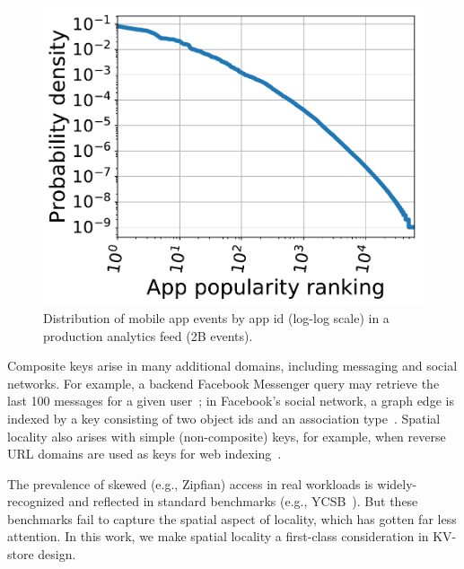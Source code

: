 

\begin{figure}[tb]
\centering
\includegraphics[width=0.6\columnwidth]{figs/app_names_loglog_line.pdf}
\caption{{Distribution of mobile app events by app id (log-log scale) in a production analytics feed (2B events).}}
\label{fig:cdf}
\end{figure}

Composite keys arise in many additional domains, including messaging and social networks. 
For example, a backend Facebook Messenger query may retrieve the last 100 messages for a 
given user~\cite{Borthakur:2011:AHG:1989323.1989438}; %
in Facebook's social network, a graph edge is indexed by a key consisting of two 
object ids and an association type~\cite{Armstrong:2013:LDB:2463676.2465296}.
Spatial locality   also arises with simple (non-composite) keys, for example, when 
reverse  URL domains are used as keys for web  indexing~\cite{Cho:1998:ECT:297805.297835}. 

The prevalence of skewed (e.g., Zipfian)  access  in real workloads is widely-recognized 
and reflected in standard benchmarks (e.g., YCSB~\cite{YCSB}). %
But these benchmarks fail to capture the spatial aspect of locality, which has gotten far less attention.
In this work, we make spatial locality a first-class consideration in KV-store design.



